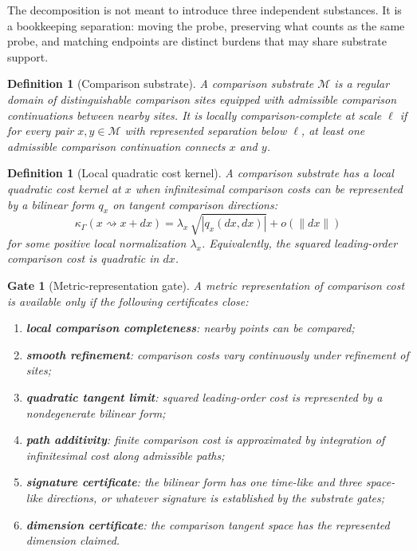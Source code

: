 \documentclass[11pt]{article}
\newtheorem{definition}[theorem]{Definition}
\newtheorem{gate}[theorem]{Gate}
\theoremstyle{remark}
\newcommand{\G}{\Gamma}
\newcommand{\goes}{\rightsquigarrow}
\newcommand{\Cost}{\kappa}
\newcommand{\Mgeom}{\mathcal M}
\begin{document}
The decomposition is not meant to introduce three independent substances.  It is a bookkeeping separation: moving the probe, preserving what counts as the same probe, and matching endpoints are distinct burdens that may share substrate support.

\begin{definition}[Comparison substrate]
A comparison substrate \(\Mgeom\) is a regular domain of distinguishable comparison sites equipped with admissible comparison continuations between nearby sites.  It is \emph{locally comparison-complete} at scale \(\ell\) if for every pair \(x,y\in\Mgeom\) with represented separation below \(\ell\), at least one admissible comparison continuation connects \(x\) and \(y\).
\end{definition}

\begin{definition}[Local quadratic cost kernel]
A comparison substrate has a local quadratic cost kernel at \(x\) when infinitesimal comparison costs can be represented by a bilinear form \(q_x\) on tangent comparison directions:
\[
        \Cost_\G(x\goes x+dx)
        =
        \lambda_x\,\sqrt{|q_x(dx,dx)|}+o(\|dx\|)
\]
for some positive local normalization \(\lambda_x\).  Equivalently, the squared leading-order comparison cost is quadratic in \(dx\).
\end{definition}

\begin{gate}[Metric-representation gate]
A metric representation of comparison cost is available only if the following certificates close:
\begin{enumerate}
\item \textbf{local comparison completeness}: nearby points can be compared;
\item \textbf{smooth refinement}: comparison costs vary continuously under refinement of sites;
\item \textbf{quadratic tangent limit}: squared leading-order cost is represented by a nondegenerate bilinear form;
\item \textbf{path additivity}: finite comparison cost is approximated by integration of infinitesimal cost along admissible paths;
\item \textbf{signature certificate}: the bilinear form has one time-like and three space-like directions, or whatever signature is established by the substrate gates;
\item \textbf{dimension certificate}: the comparison tangent space has the represented dimension claimed.
\end{enumerate}
\end{gate}
\end{document}
